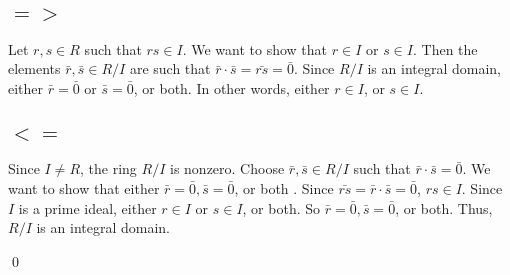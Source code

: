 \documentclass[x11names,reqno,14pt]{extarticle}
\begin{document}
\subsection*{$=>$} Let $r, s \in R$ such that $rs \in I$. We want to show that $r \in I$ or $s \in I$. Then the elements $\bar{r},\bar{s} \in R/I$ are such that $\bar{r}\cdot\bar{s} = \bar{rs} = \bar{0}$. Since $R/I$ is an integral domain, either $\bar{r} = \bar{0}$ or $\bar{s} = \bar{0}$, or both. In other words, either $r \in I$, or $s \in I$. 

\subsection*{$<=$} Since $I\neq R$, the ring $R/I$ is nonzero. Choose $\bar{r},\bar{s} \in R/I$ such that $\bar{r}\cdot\bar{s} =\bar{0}$. We want to show that either $\bar{r} = \bar{0}, \bar{s} = \bar{0}$, or both . Since $\bar{rs} = \bar{r}\cdot\bar{s}=\bar{0}$, $rs \in I$. Since $I$ is a prime ideal, either $r \in I$ or $s \in I$, or both. So $\bar{r} = \bar{0}, \bar{s} = \bar{0}$, or both. Thus, $R/I$ is an integral domain. 

\qed
\end{document}
